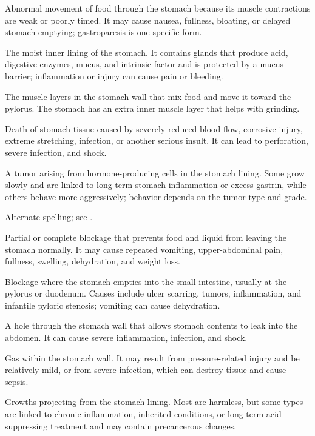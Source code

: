  Abnormal movement of food through the stomach because its muscle contractions are weak or poorly timed. It may cause nausea, fullness, bloating, or delayed stomach emptying; gastroparesis is one specific form.

 The moist inner lining of the stomach. It contains glands that produce acid, digestive enzymes, mucus, and intrinsic factor and is protected by a mucus barrier; inflammation or injury can cause pain or bleeding.

 The muscle layers in the stomach wall that mix food and move it toward the pylorus. The stomach has an extra inner muscle layer that helps with grinding.

 Death of stomach tissue caused by severely reduced blood flow, corrosive injury, extreme stretching, infection, or another serious insult. It can lead to perforation, severe infection, and shock.

 A tumor arising from hormone-producing cells in the stomach lining. Some grow slowly and are linked to long-term stomach inflammation or excess gastrin, while others behave more aggressively; behavior depends on the tumor type and grade.

 Alternate spelling; see .

 Partial or complete blockage that prevents food and liquid from leaving the stomach normally. It may cause repeated vomiting, upper-abdominal pain, fullness, swelling, dehydration, and weight loss.

 Blockage where the stomach empties into the small intestine, usually at the pylorus or duodenum. Causes include ulcer scarring, tumors, inflammation, and infantile pyloric stenosis; vomiting can cause dehydration.

 A hole through the stomach wall that allows stomach contents to leak into the abdomen. It can cause severe inflammation, infection, and shock.

 Gas within the stomach wall. It may result from pressure-related injury and be relatively mild, or from severe infection, which can destroy tissue and cause sepsis.

 Growths projecting from the stomach lining. Most are harmless, but some types are linked to chronic inflammation, inherited conditions, or long-term acid-suppressing treatment and may contain precancerous changes.

